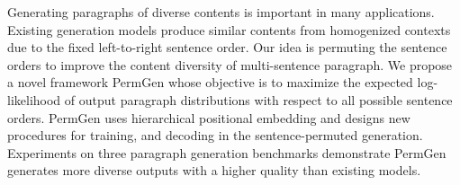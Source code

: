 Generating paragraphs of diverse contents is important in many applications. Existing generation models produce similar contents from homogenized contexts due to the fixed left-to-right sentence order. Our idea is permuting the sentence orders to improve the content diversity of multi-sentence paragraph. We propose a novel framework PermGen whose objective is to maximize the expected log-likelihood of output paragraph distributions with respect to all possible sentence orders. PermGen uses hierarchical positional embedding and designs new procedures for training, and decoding in the sentence-permuted generation. Experiments on three paragraph generation benchmarks demonstrate PermGen generates more diverse outputs with a higher quality than existing models.
